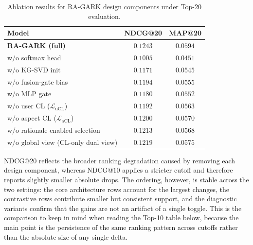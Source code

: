 \begin{table}[H]
\centering
\caption{Ablation results for RA-GARK design components under Top-20 evaluation.}
\label{tab:ablation@20}
\begin{tabular}{lcc}
\toprule
Model & NDCG@20 & MAP@20 \\
\midrule
\textbf{RA-GARK (full)}              & $\mathbf{0.1243}$ & $\mathbf{0.0594}$ \\
\midrule
w/o softmax head                     & $0.1005$ & $0.0451$ \\
w/o KG-SVD init                      & $0.1171$ & $0.0545$ \\
w/o fusion-gate bias                 & $0.1194$ & $0.0555$ \\
w/o MLP gate                         & $0.1180$ & $0.0552$ \\
\midrule
w/o user CL ($\mathcal{L}_{\mathrm{uCL}}$)  & $0.1192$ & $0.0563$ \\
w/o aspect CL ($\mathcal{L}_{\mathrm{aCL}}$) & $0.1200$ & $0.0570$ \\
\midrule
w/o rationale-enabled selection      & $0.1213$ & $0.0568$ \\
w/o global view (CL-only dual view)  & $0.1219$ & $0.0575$ \\
\bottomrule
\end{tabular}
\end{table}

NDCG@$20$ reflects the broader ranking degradation caused by removing each design component, whereas NDCG@$10$ applies a stricter cutoff and therefore reports slightly smaller absolute drops. The ordering, however, is stable across the two settings: the core architecture rows account for the largest changes, the contrastive rows contribute smaller but consistent support, and the diagnostic variants confirm that the gains are not an artifact of a single toggle. This is the comparison to keep in mind when reading the Top-10 table below, because the main point is the persistence of the same ranking pattern across cutoffs rather than the absolute size of any single delta.

